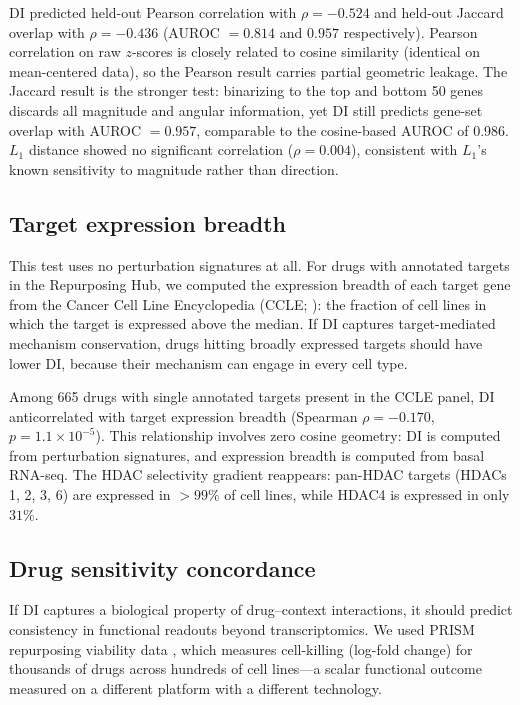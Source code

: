 \documentclass[11pt]{article}
\begin{document}
DI predicted held-out Pearson correlation with
$\rho = -0.524$ and held-out Jaccard overlap
with $\rho = -0.436$
(AUROC $= 0.814$ and
$0.957$ respectively).  Pearson correlation on raw $z$-scores is closely
related to cosine similarity (identical on mean-centered data), so the
Pearson result carries partial geometric leakage.  The Jaccard result is
the stronger test: binarizing to the top and bottom 50 genes discards all
magnitude and angular information, yet DI still predicts gene-set
overlap with AUROC $= 0.957$, comparable to the cosine-based AUROC of
0.986.  $L_1$ distance showed no significant correlation
($\rho = 0.004$), consistent with $L_1$'s known sensitivity to
magnitude rather than direction.

\subsection{Target expression breadth}

This test uses no perturbation signatures at all.  For drugs with
annotated targets in the Repurposing Hub, we computed the expression
breadth of each target gene from the Cancer Cell Line Encyclopedia
(CCLE; \citealt{barretina2012cancer}): the fraction of cell lines in
which the target is expressed above the median.  If DI captures
target-mediated mechanism conservation, drugs hitting broadly expressed
targets should have lower DI, because their mechanism can engage in
every cell type.

Among 665 drugs with single annotated targets present
in the CCLE panel, DI anticorrelated with target expression breadth
(Spearman $\rho = -0.170$,
$p = 1.1 \times 10^{-5}$).  This relationship involves
zero cosine geometry: DI is computed from perturbation signatures, and
expression breadth is computed from basal RNA-seq.  The HDAC selectivity
gradient reappears: pan-HDAC targets (HDACs 1, 2, 3, 6) are expressed
in $>99\%$ of cell lines, while HDAC4
is expressed in only $31\%$.

\subsection{Drug sensitivity concordance}

If DI captures a biological property of drug--context interactions,
it should predict consistency in functional readouts beyond
transcriptomics.  We used PRISM repurposing viability data
\citep{corsello2020discovering}, which measures cell-killing (log-fold
change) for thousands of drugs across hundreds of cell lines---a
scalar functional outcome measured on a different platform with a
different technology.
\end{document}
